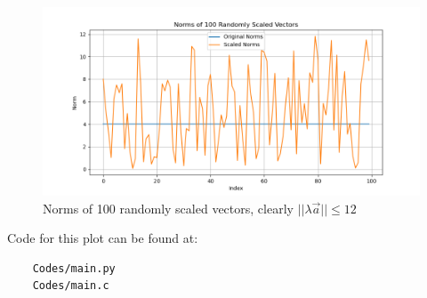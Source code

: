 \documentclass[journal]{IEEEtran}
\begin{document}
\newpage

\begin{figure}[H]
	\centering
	\includegraphics[width=0.75\columnwidth]{Figures/Figure.png}
	\caption{Norms of 100 randomly scaled vectors, clearly $\vert\vert\lambda\vec{a}\vert\vert \leq 12$}
	\label{fig}
\end{figure}

Code for this plot can be found at:
\begin{lstlisting}
    Codes/main.py
    Codes/main.c
\end{lstlisting}
\end{document}
